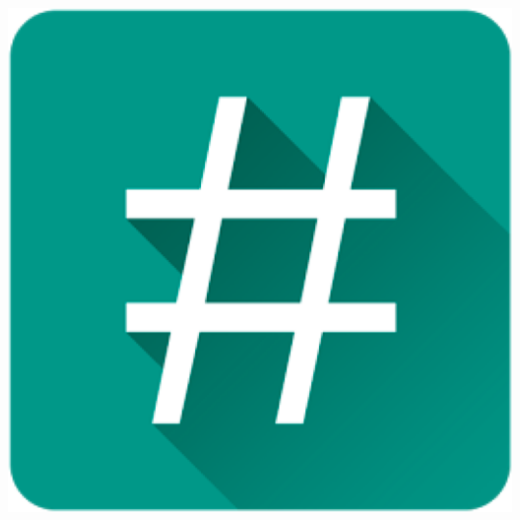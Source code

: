 \documentclass[aspectratio=1610, ]{beamer}%
\begin{document}
\begin{frame}[t]
\begin{columns}
\begin{column}{0.25\linewidth}
        \includegraphics[width=\linewidth]{img/superSU.png}
      \end{column}
    \end{columns}
  \end{frame}
\end{document}
